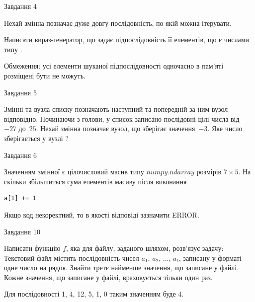 \documentclass[12pt, ukrainian]{article}
\begin{document}
{               
{\begin{center}Завдання {4}\end{center}}
\vspace{-6mm}
Нехай змінна  позначає дуже довгу послідовність, по якій можна ітерувати.

Написати вираз-генератор, що задає підпослідовність її елементів, що є числами типу .

Обмеження: усі елементи шуканої підпослідовності одночасно в пам'яті розміщені бути не можуть.\par

\vspace{10mm}
               
{\begin{center}Завдання {5}\end{center}}
\vspace{-6mm}
Змінні  та  вузла списку позначають наступний та попередній за ним вузол відповідно. Починаючи з голови, у список записано послідовні цілі числа від~$-27$ до~$25$. Нехай змінна  позначає вузол, що зберігає значення~$-3$.
Яке число зберігається у вузлі  ?\par

               
{\begin{center}Завдання {6}\end{center}}
\vspace{-6mm}
Значенням змінної  є цілочисловий масив типу $numpy.ndarray$ розмірів $7{\times}5$. На скільки збільшиться сума елементів масиву  після виконання
\begin{verbatim}
a[1] += 1
\end{verbatim}


Якщо код некоректний, то в якості відповіді зазначити ERROR.\par

               
{\begin{center}Завдання {10}\end{center}}
\vspace{-6mm}

Написати функцію $f$, яка для файлу, заданого шляхом, розв’язує задачу:\\ Текстовий файл містить послідовність чисел $a_1$, $a_2$, $\ldots$, $a_t$, записану у форматі одне число на рядок. Знайти третє найменше значення, що записане у файлі. Кожне значення, що записане у файлі, враховується тільки один раз. \par
Для послідовності 1, 4, 12, 5, 1, 0 таким значенням буде 4.

}
\end{document}
